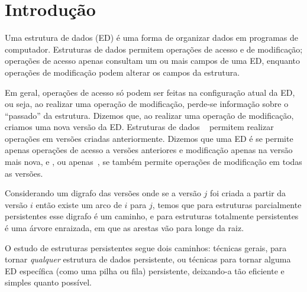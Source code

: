\documentclass[../../main.tex]{subfiles}
\begin{document}
\setcounter{secnumdepth}{0}

\chapter*{Introdução}

Uma estrutura de dados (ED) é uma forma de organizar dados em programas de computador. Estruturas de dados permitem operações de acesso e de modificação; operações de acesso apenas consultam um ou mais campos de uma ED, enquanto operações de modificação podem alterar os campos da estrutura.

Em geral, operações de acesso só podem ser feitas na configuração atual da ED, ou seja, ao realizar uma operação de modificação, perde-se informação sobre o ``passado'' da estrutura. Dizemos que, ao realizar uma operação de modificação, criamos uma nova versão da ED. Estruturas de dados ~\cite{DriscollSST1989} permitem realizar operações em versões criadas anteriormente. Dizemos que uma ED é  se permite apenas operações de acesso a versões anteriores e modificação apenas na versão mais nova, e , ou apenas~, se também permite operações de modificação em todas as versões.

Considerando um digrafo das versões onde se a versão $j$ foi criada a partir da versão $i$ então existe um arco de $i$ para $j$, temos que para estruturas parcialmente persistentes esse digrafo é um caminho, e para estruturas totalmente persistentes é uma árvore enraizada, em que as arestas vão para longe da raiz.

O estudo de estruturas persistentes segue dois caminhos: técnicas gerais, para tornar \emph{qualquer} estrutura de dados persistente, ou técnicas para tornar alguma ED específica (como uma pilha ou fila) persistente, deixando-a tão eficiente e simples quanto possível.

\setcounter{secnumdepth}{1}
\end{document}

